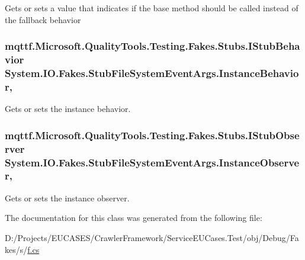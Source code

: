 Gets or sets a value that indicates if the base method should be called instead of the fallback behavior

\hypertarget{class_system_1_1_i_o_1_1_fakes_1_1_stub_file_system_event_args_ad6c4decbe9be1e0c57bb203c2a6dc021}{
\subsubsection[{Instance\-Behavior}]{\setlength{\rightskip}{0pt plus 5cm}mqttf.\-Microsoft.\-Quality\-Tools.\-Testing.\-Fakes.\-Stubs.\-I\-Stub\-Behavior System.\-I\-O.\-Fakes.\-Stub\-File\-System\-Event\-Args.\-Instance\-Behavior\hspace{0.3cm}{\ttfamily [get]}, {\ttfamily [set]}}}\label{class_system_1_1_i_o_1_1_fakes_1_1_stub_file_system_event_args_ad6c4decbe9be1e0c57bb203c2a6dc021}


Gets or sets the instance behavior.

\hypertarget{class_system_1_1_i_o_1_1_fakes_1_1_stub_file_system_event_args_aa27b604be2c8a26e26654521d8f5c860}{
\subsubsection[{Instance\-Observer}]{\setlength{\rightskip}{0pt plus 5cm}mqttf.\-Microsoft.\-Quality\-Tools.\-Testing.\-Fakes.\-Stubs.\-I\-Stub\-Observer System.\-I\-O.\-Fakes.\-Stub\-File\-System\-Event\-Args.\-Instance\-Observer\hspace{0.3cm}{\ttfamily [get]}, {\ttfamily [set]}}}\label{class_system_1_1_i_o_1_1_fakes_1_1_stub_file_system_event_args_aa27b604be2c8a26e26654521d8f5c860}


Gets or sets the instance observer.



The documentation for this class was generated from the following file\-:\begin{DoxyCompactItemize}
\item 
D\-:/\-Projects/\-E\-U\-C\-A\-S\-E\-S/\-Crawler\-Framework/\-Service\-E\-U\-Cases.\-Test/obj/\-Debug/\-Fakes/s/\hyperlink{s_2f_8cs}{f.\-cs}\end{DoxyCompactItemize}
